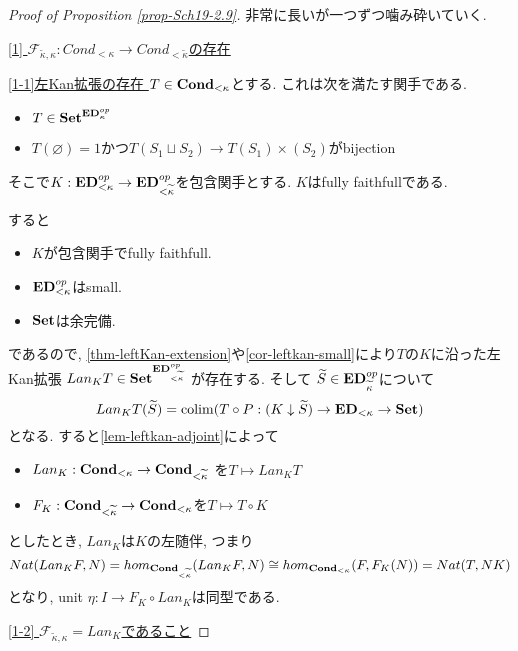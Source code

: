 \documentclass[dvipdfmx,a4paper,11pt]{article}
\newcommand{\colim}{{\rm colim}}
\theoremstyle{definition}
\begin{document}
\begin{proof}[Proof of Proposition \ref{prop-Sch19-2.9}]
非常に長いが一つずつ噛み砕いていく. 

\underline{[1] $\mathcal{F}_{\widetilde{\kappa}, \kappa} :  Cond_{<\kappa} \to Cond_{<\widetilde{\kappa}}$の存在} 

\underline{[1-1]左Kan拡張の存在 }$T \in {\bf Cond_{<\kappa}}$とする.
これは次を満たす関手である.
\begin{itemize}
\item $T \in {\bf Set}^{{\bf ED}_{\kappa}^{op}}$
\item $T(\varnothing)=1$かつ$T(S_1 \sqcup S_2) \to T(S_1) \times (S_2)$がbijection
\end{itemize}
そこで$K : {\bf ED}_{<\kappa}^{op} \to {\bf ED}_{<\widetilde{\kappa}}^{op}$を包含関手とする. 
$K$はfully faithfullである.

すると
\begin{itemize}
\item $K$が包含関手でfully faithfull.
\item ${\bf ED}_{<\kappa}^{op}$はsmall.
\item ${\bf Set }$は余完備.
\end{itemize}
であるので, \ref{thm-leftKan-extension}や\ref{cor-leftkan-small}により$T$の$K$に沿った左Kan拡張
$Lan_{K}T \in {\bf Set}^{{\bf ED}_{<\widetilde{\kappa}}^{op}}$
が存在する. そして
$\widetilde{S} \in {\bf ED}_{\widetilde{\kappa}}^{op}$について
$$
Lan_{K}T(\widetilde{S}) = \colim(T \circ P : (K \downarrow \widetilde{S}) \to {\bf ED}_{<\kappa} \to {\bf Set})
$$
となる.
すると\ref{lem-leftkan-adjoint}によって
\begin{itemize}
\item $Lan_{K} : {\bf  Cond_{<\kappa}} \to { \bf Cond_{<\widetilde{\kappa}} }$ を$T \mapsto Lan_{K}T$
\item $F_K : {\bf Cond_{<\widetilde{\kappa}} }\to {\bf Cond_{< \kappa}} $を$T \mapsto T \circ K$
\end{itemize}
としたとき, 
$Lan_{K}$は$K$の左随伴, つまり
$$
Nat(Lan_{K}F, N)
=
hom_{{\bf Cond_{<\widetilde{\kappa}}} }(Lan_{K}F, N)
 \cong
 hom_{{\bf Cond_{< \kappa}}}(F, F_{K}(N)) 
 = Nat(T,NK)
$$
となり, unit $\eta:  I \to  F_K \circ Lan_{K} $は同型である. 

\underline{[1-2] $\mathcal{F}_{\widetilde{\kappa}, \kappa} = Lan_{K}$であること}


\end{proof}
\end{document}
